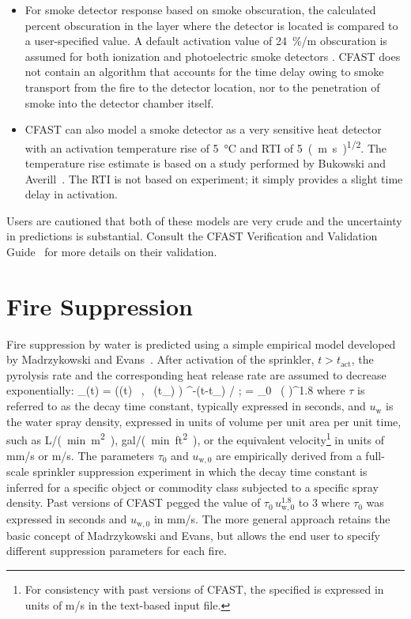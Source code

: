 \documentclass[12pt,twoside]{book}
\begin{document}
\begin{itemize}
\item For smoke detector response based on smoke obscuration, the calculated percent obscuration in the layer where the detector is located is compared to a user-specified value. A default activation value of 24~\unit{\%/m} obscuration is assumed for both ionization and photoelectric smoke detectors \cite{Milke:2008}. CFAST does not contain an algorithm that accounts for the time delay owing to smoke transport from the fire to the detector location, nor to the penetration of smoke into the detector chamber itself.
\item CFAST can also model a smoke detector as a very sensitive heat detector with an activation temperature rise of 5~\unit{\degreeCelsius} and RTI of 5~\unit{(m.s)^{1/2}}. The temperature rise estimate is based on a study performed by Bukowski and Averill~\cite{Bukowski:1998}. The RTI is not based on experiment; it simply provides a slight time delay in activation.
\end{itemize}
Users are cautioned that both of these models are very crude and the uncertainty in predictions is substantial. Consult the CFAST Verification and Validation Guide~\cite{CFAST_Valid_Guide_8} for more details on their validation.


\section{Fire Suppression} \label{sec:suppression}

Fire suppression by water is predicted using a simple empirical model developed by Madrzykowski \cite{Madrzykowski:1992} and Evans~\cite{Evans:1993}. After activation of the sprinkler, $t > t_{\mathrm{act}}$, the pyrolysis rate and the corresponding heat release rate are assumed to decrease exponentially:
\be
   \dQ_{}(t) = \min \left(\dQ(t) \, , \, \dQ(t_{}) \right) \; {}^{-(t-t_{}) /\tau}   \quad ; \quad \tau = \tau_0 \, \left(  \right)^{1.8}
\ee
where $\tau$ is referred to as the decay time constant, typically expressed in seconds, and $u_{\mathrm{w}}$ is the water spray density, expressed in units of volume per unit area per unit time, such as \unit{L/(min.m^2)}, \unit{gal/(min.ft^2)}, or the equivalent velocity\footnote{For consistency with past versions of CFAST, the specified  is expressed in units of m/s in the text-based input file.} in units of mm/s or m/s. The parameters $\tau_0$ and $u_{\mathrm{w,0}}$ are empirically derived from a full-scale sprinkler suppression experiment in which the decay time constant is inferred for a specific object or commodity class subjected to a specific spray density. Past versions of CFAST pegged the value of $\tau_0 \, u_{\mathrm{w,0}}^{1.8}$ to 3 where  $\tau_0$ was expressed in seconds and $u_{\mathrm{w,0}}$ in mm/s. The more general approach retains the basic concept of Madrzykowski and Evans, but allows the end user to specify different suppression parameters for each fire.
\end{document}
